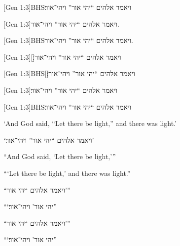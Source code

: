 \documentclass[12pt]{article}
\begin{document}
[Gen 1:3]{BHS}{ויאמר אלהים \enquote{יהי אור}
ויהי־אור׃}

[Gen 1:3]{ויאמר אלהים \enquote{יהי אור} ויהי־אור}.

[Gen 1:3]{BHS}{ויאמר אלהים \enquote{יהי אור}
ויהי־אור}.

[Gen 1:3][׃]{ויאמר אלהים \enquote{יהי אור} ויהי־אור}

[Gen 1:3]{BHS}[׃]{ויאמר אלהים \enquote{יהי אור}
ויהי־אור}

[Gen 1:3]{ויאמר אלהים \enquote{יהי אור} ויהי־אור׃}

[Gen 1:3]{BHS}{ויאמר אלהים \enquote{יהי אור}
ויהי־אור׃}

‘And God said, “Let there be light,” and there was light.’

\texthebrew{‘ויאמר אלהים “יהי אור” ויהי־אור׃’}

\enquote{And God said, \enquote{Let there be light,}}

\enquote{\enquote{Let there be light,} and there was light.}

\foreignquote{hebrew}{ויאמר אלהים \enquote{יהי אור}}

\foreignquote{hebrew}{\enquote{יהי אור} ויהי־אור׃}

\hyphenquote{hebrew}{ויאמר אלהים \enquote{יהי אור}}

\hyphenquote{hebrew}{\enquote{יהי אור} ויהי־אור׃}

\printbibliography
\end{document}
